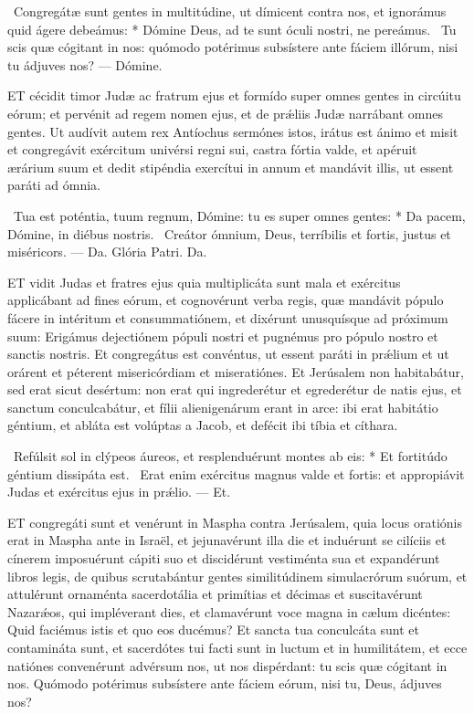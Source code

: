 \R\ Congregátæ sunt gentes in multitúdine, ut dímicent contra nos, et ignorámus quid ágere debeámus: * Dómine Deus, ad te sunt óculi nostri, ne pereámus. \V\ Tu scis quæ cógitant in nos: quómodo potérimus subsístere ante fáciem illórum, nisi tu ádjuves nos? — Dómine.



\lettrine[lines=2]{E}{T} cécidit timor Judæ ac fratrum ejus et formído super omnes gentes in circúitu eórum; et pervénit ad regem nomen ejus, et de prǽliis Judæ narrábant omnes gentes. Ut audívit autem rex Antíochus sermónes istos, irátus est ánimo et misit et congregávit exércitum univérsi regni sui, castra fórtia valde, et apéruit ærárium suum et dedit stipéndia exercítui in annum et mandávit illis, ut essent paráti ad ómnia.

\R\ Tua est poténtia, tuum regnum, Dómine: tu es super omnes gentes: * Da pacem, Dómine, in diébus nostris. \V\ Creátor ómnium, Deus, terríbilis et fortis, justus et miséricors. — Da. Glória Patri. Da.




\lettrine[lines=2]{E}{T} vidit Judas et fratres ejus quia multiplicáta sunt mala et exércitus applicábant ad fines eórum, et cognovérunt verba regis, quæ mandávit pópulo fácere in intéritum et consummatiónem, et dixérunt unusquísque ad próximum suum: Erigámus dejectiónem pópuli nostri et pugnémus pro pópulo nostro et sanctis nostris. Et congregátus est convéntus, ut essent paráti in prǽlium et ut orárent et péterent misericórdiam et miseratiónes. Et Jerúsalem non habitabátur, sed erat sicut desértum: non erat qui ingrederétur et egrederétur de natis ejus, et sanctum conculcabátur, et fílii alienigenárum erant in arce: ibi erat habitátio géntium, et abláta est volúptas a Jacob, et defécit ibi tíbia et cíthara.

\R\ Refúlsit sol in clýpeos áureos, et resplenduérunt montes ab eis: * Et fortitúdo géntium dissipáta est. \V\ Erat enim exércitus magnus valde et fortis: et appropiávit Judas et exércitus ejus in prǽlio. — Et.


\lettrine[lines=2]{E}{T} congregáti sunt et venérunt in Maspha contra Jerúsalem, quia locus oratiónis erat in Maspha ante in Israël, et jejunavérunt illa die et induérunt se cilíciis et cínerem imposuérunt cápiti suo et discidérunt vestiménta sua et expandérunt libros legis, de quibus scrutabántur gentes similitúdinem simulacrórum suórum, et attulérunt ornaménta sacerdotália et primítias et décimas et suscitavérunt Nazarǽos, qui impléverant dies, et clamavérunt voce magna in cælum dicéntes: Quid faciémus istis et quo eos ducémus? Et sancta tua conculcáta sunt et contamináta sunt, et sacerdótes tui facti sunt in luctum et in humilitátem, et ecce natiónes convenérunt advérsum nos, ut nos dispérdant: tu scis quæ cógitant in nos. Quómodo potérimus subsístere ante fáciem eórum, nisi tu, Deus, ádjuves nos?

